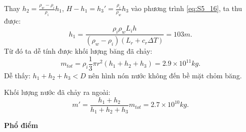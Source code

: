 \begin{enumerate}[label=(\alph*)]
\begin{enumerate}[label=(\roman*)]
    Thay $h_2=\frac{\rho_w-\rho_i}{\rho_i}h_1$, $H-h_1=h_3'=\frac{\rho_i}{\rho_w}h_3$ vào phương trình \ref{eq:S5_16}, ta thu được:
    \begin{equation}
        h_1=\frac{\rho_i\rho_wL_ih}{(\rho_w-\rho_i)(L_r+c_r\Delta T)}= 103\si{m}.
    \end{equation}
    Từ đó ta dễ tính được khối lượng băng đã chảy:
    \begin{equation}
        m_{tot}= \rho_i\frac{1}{3}\pi r^2(h_1+h_2+h_3) = 2.9\times10^{11}\si{kg}.
    \end{equation}  
    Dễ thấy: $h_1+h_2+h_3<D$ nên hình nón nước không đến bề mặt chỏm băng.
    
    Khối lượng nước đã chảy ra ngoài:
    \begin{equation}
        m'=\frac{h_1+h_2}{h_1+h_2+h_3}m_{tot}=2.7\times10^{10}\si{kg}.
    \end{equation}
    \end{enumerate}
\end{enumerate}
\textbf{Phổ điểm}
